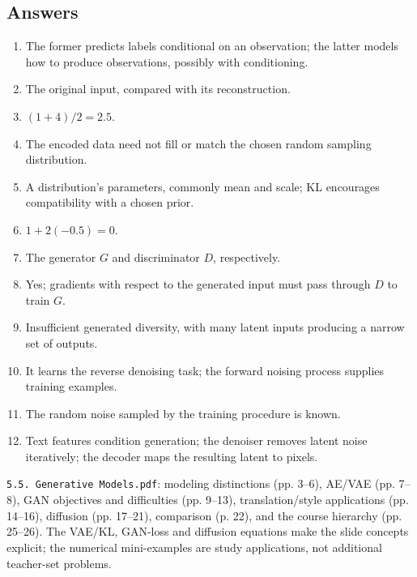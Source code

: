\documentclass[11pt]{article}
\begin{document}
\subsection{Answers}
\begin{enumerate}
\item The former predicts labels conditional on an observation; the latter models how to produce observations, possibly with conditioning.
\item The original input, compared with its reconstruction.
\item $(1+4)/2=2.5$.
\item The encoded data need not fill or match the chosen random sampling distribution.
\item A distribution's parameters, commonly mean and scale; KL encourages compatibility with a chosen prior.
\item $1+2(-0.5)=0$.
\item The generator $G$ and discriminator $D$, respectively.
\item Yes; gradients with respect to the generated input must pass through $D$ to train $G$.
\item Insufficient generated diversity, with many latent inputs producing a narrow set of outputs.
\item It learns the reverse denoising task; the forward noising process supplies training examples.
\item The random noise sampled by the training procedure is known.
\item Text features condition generation; the denoiser removes latent noise iteratively; the decoder maps the resulting latent to pixels.
\end{enumerate}

\texttt{5.5. Generative Models.pdf}: modeling distinctions (pp. 3--6), AE/VAE (pp. 7--8), GAN objectives and difficulties (pp. 9--13), translation/style applications (pp. 14--16), diffusion (pp. 17--21), comparison (p. 22), and the course hierarchy (pp. 25--26). The VAE/KL, GAN-loss and diffusion equations make the slide concepts explicit; the numerical mini-examples are study applications, not additional teacher-set problems.
\end{document}
